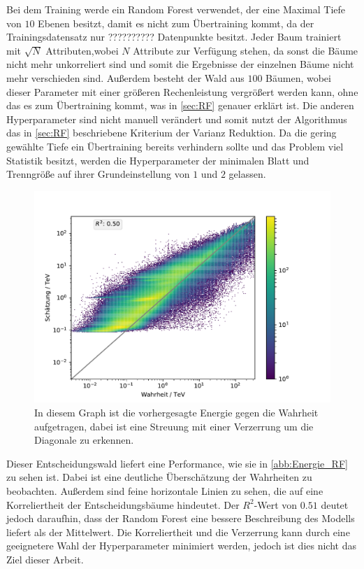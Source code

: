 Bei dem Training werde ein Random Forest verwendet, der eine Maximal Tiefe von $10$ Ebenen besitzt, damit es nicht zum Übertraining
kommt, da der Trainingsdatensatz nur ?????????? Datenpunkte besitzt.
Jeder Baum trainiert mit $\sqrt{N}$ Attributen,wobei $N$ Attribute zur Verfügung stehen, da sonst die Bäume nicht mehr unkorreliert
sind und somit die Ergebnisse der einzelnen Bäume nicht mehr verschieden sind.
Außerdem besteht der Wald aus $100$ Bäumen, wobei dieser Parameter mit einer größeren Rechenleistung vergrößert werden kann, ohne
das es zum Übertraining kommt, was in \autoref{sec:RF} genauer erklärt ist.
Die anderen Hyperparameter sind nicht manuell verändert und somit nutzt der Algorithmus das in \autoref{sec:RF} beschriebene Kriterium der
Varianz Reduktion.
Da die gering gewählte Tiefe ein Übertraining bereits verhindern sollte und das Problem viel Statistik besitzt, werden die Hyperparameter
der minimalen Blatt und Trenngröße auf ihrer Grundeinstellung von $1$ und $2$ gelassen.

\begin{figure}
  \includegraphics{Plots/RF.pdf}
  \caption{In diesem Graph ist die vorhergesagte Energie gegen die Wahrheit aufgetragen, dabei ist eine Streuung mit einer Verzerrung um die
          Diagonale zu erkennen.}
  \label{abb:Energie_RF}
\end{figure}

Dieser Entscheidungswald liefert eine Performance, wie sie in \autoref{abb:Energie_RF} zu sehen ist.
Dabei ist eine deutliche Überschätzung der Wahrheiten zu beobachten. Außerdem sind feine horizontale Linien zu sehen, die auf eine Korreliertheit
der Entscheidungsbäume hindeutet.
Der $R^2$-Wert von $\num{0.51}$ deutet jedoch daraufhin, dass der Random Forest eine bessere Beschreibung des Modells liefert als der Mittelwert.
Die Korreliertheit und die Verzerrung kann durch eine geeignetere Wahl der Hyperparameter minimiert werden, jedoch ist dies nicht das Ziel dieser
Arbeit.

